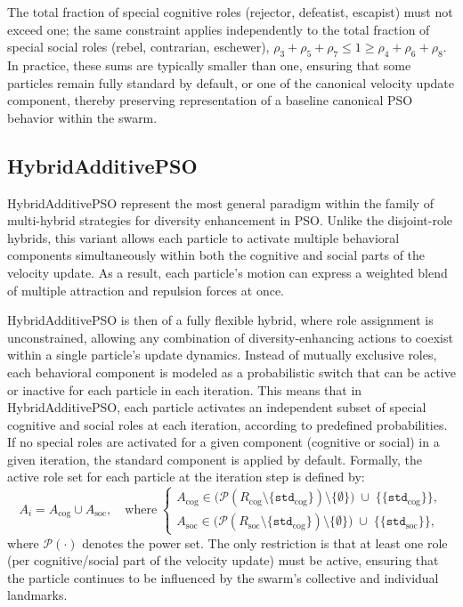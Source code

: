 {The total fraction of special cognitive roles (rejector, defeatist, escapist) must not exceed one; the same constraint applies independently to the total fraction of special social roles (rebel, contrarian, eschewer), \(\rho_3 + \rho_5 +  \rho_7 \leq 1 \geq \rho_4 + \rho_6 + \rho_8\). In practice, these sums are typically smaller than one, ensuring that some particles remain fully standard by default, or one of the canonical velocity update component, thereby preserving representation of a baseline canonical PSO behavior within the swarm.


\subsection{HybridAdditivePSO}


HybridAdditivePSO represent the most general paradigm within the family of multi-hybrid strategies for diversity enhancement in PSO. Unlike the disjoint-role hybrids, this variant allows each particle to activate multiple behavioral components simultaneously within both the cognitive and social parts of the velocity update. As a result, each particle’s motion can express a weighted blend of multiple attraction and repulsion forces at once.



HybridAdditivePSO is then of a fully flexible hybrid, where role assignment is unconstrained, allowing any combination of diversity-enhancing actions to coexist within a single particle’s update dynamics. Instead of mutually exclusive roles, each behavioral component is modeled as a probabilistic switch that can be active or inactive for each particle in each iteration. This means that in HybridAdditivePSO, each particle activates an independent subset of special cognitive and social roles at each iteration, according to predefined probabilities. If no special roles are activated for a given component (cognitive or social) in a given iteration, the standard component is applied by default. Formally, the active role set for each particle at the iteration step is defined by:
\begin{equation}\label{eq:additive_roles}
A_i = A_{\text{cog}} \cup A_{\text{soc}}, 
\quad 
\text{where}
\;
\begin{cases}
A_{\text{cog}} \in \big( \mathcal{P}(R_{\text{cog}}\setminus \{\texttt{std}_{\text{cog}}\} ) \setminus \{\emptyset\} \big) \; \cup \; \{\{\texttt{std}_{\text{cog}}\}\},\\[6pt]
A_{\text{soc}} \in \big( \mathcal{P}(R_{\text{soc}}\setminus \{\texttt{std}_{\text{cog}}\} ) \setminus \{\emptyset\} \big) \; \cup \; \{\{\texttt{std}_{\text{soc}}\}\},
\end{cases}
\end{equation}
where $\mathcal{P}(\cdot)$ denotes the power set. The only restriction is that at least one role (per cognitive/social part of the velocity update) must be active, ensuring that the particle continues to be influenced by the swarm’s collective and individual landmarks.

}
